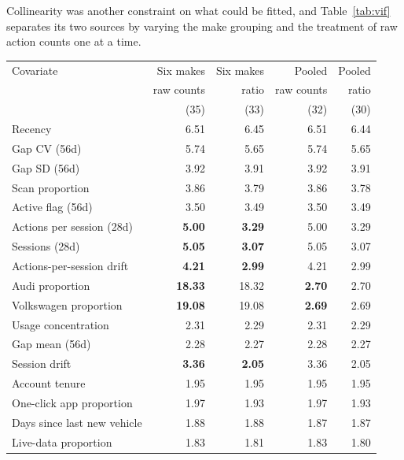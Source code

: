 Collinearity was another constraint on what could be fitted, and Table~\ref{tab:vif} separates its two sources by varying the make grouping and the treatment of raw action counts one at a time.

\begin{table}[htbp]
\centering
\footnotesize
\begin{tabular}{@{}lrrrr@{}}
\toprule
Covariate & Six makes & Six makes & Pooled & Pooled \\
          & raw counts & ratio & raw counts & ratio \\
          & (35)    & (33)     & (32)        & (30)  \\
\midrule
Recency                     & 6.51 & 6.45 & 6.51 & 6.44 \\
Gap CV (56d)                & 5.74 & 5.65 & 5.74 & 5.65 \\
Gap SD (56d)                & 3.92 & 3.91 & 3.92 & 3.91 \\
Scan proportion             & 3.86 & 3.79 & 3.86 & 3.78 \\
Active flag (56d)           & 3.50 & 3.49 & 3.50 & 3.49 \\
Actions per session (28d)   & \textbf{\textcolor{volhl}{5.00}} & \textbf{\textcolor{volhl}{3.29}} & 5.00 & 3.29 \\
Sessions (28d)              & \textbf{\textcolor{volhl}{5.05}} & \textbf{\textcolor{volhl}{3.07}} & 5.05 & 3.07 \\
Actions-per-session drift   & \textbf{\textcolor{volhl}{4.21}} & \textbf{\textcolor{volhl}{2.99}} & 4.21 & 2.99 \\
Audi proportion             & \textbf{18.33} & 18.32 & \textbf{2.70} & 2.70 \\
Volkswagen proportion       & \textbf{19.08} & 19.08 & \textbf{2.69} & 2.69 \\
Usage concentration         & 2.31 & 2.29 & 2.31 & 2.29 \\
Gap mean (56d)              & 2.28 & 2.27 & 2.28 & 2.27 \\
Session drift               & \textbf{\textcolor{volhl}{3.36}} & \textbf{\textcolor{volhl}{2.05}} & 3.36 & 2.05 \\
Account tenure              & 1.95 & 1.95 & 1.95 & 1.95 \\
One-click app proportion    & 1.97 & 1.93 & 1.97 & 1.93 \\
Days since last new vehicle & 1.88 & 1.88 & 1.87 & 1.87 \\
Live-data proportion        & 1.83 & 1.81 & 1.83 & 1.80 \\

\end{tabular}
\end{table}
